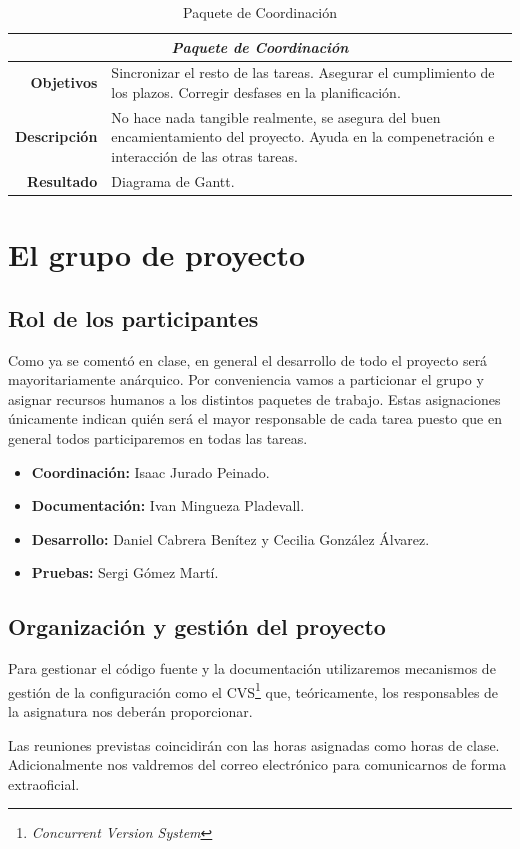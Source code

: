 \documentclass[a4paper,12pt,titlepage]{article}
\begin{document}
\begin{table}[h!]
\begin{tabular}{|r|p{}|}
\hline
\multicolumn{2}{|c|}{\emph{Paquete de Coordinación}} \\
\hline
\hline

\textbf{Objetivos} &
Sincronizar el resto de las tareas. Asegurar el cumplimiento de los plazos.
Corregir desfases en la planificación. \\
\hline
\textbf{Descripción} &
No hace nada tangible realmente, se asegura del buen encamientamiento del
proyecto. Ayuda en la compenetración e interacción de las otras tareas. \\
\hline
\textbf{Resultado} &
Diagrama de Gantt. \\
\hline
\end{tabular}
\caption{Paquete de Coordinación}\label{coord}
\end{table}


\section{El grupo de proyecto}

\subsection{Rol de los participantes}

Como ya se comentó en clase, en general el desarrollo de todo el proyecto será
mayoritariamente anárquico. Por conveniencia vamos a particionar el grupo y
asignar recursos humanos a los distintos paquetes de trabajo. Estas
asignaciones únicamente indican quién será el mayor responsable de cada tarea
puesto que en general todos participaremos en todas las tareas.

\begin{itemize}
\item \textbf{Coordinación:} Isaac Jurado Peinado.
\item \textbf{Documentación:} Ivan Mingueza Pladevall.
\item \textbf{Desarrollo:} Daniel Cabrera Benítez y Cecilia González Álvarez. 
\item \textbf{Pruebas:} Sergi Gómez Martí. 
\end{itemize}

\subsection{Organización y gestión del proyecto}

Para gestionar el código fuente y la documentación utilizaremos mecanismos de
gestión de la configuración como el CVS\footnote{\emph{Concurrent Version
System}} que, teóricamente, los responsables de la asignatura nos deberán
proporcionar.

Las reuniones previstas coincidirán con las horas asignadas como horas de
clase. Adicionalmente nos valdremos del correo electrónico para comunicarnos
de forma extraoficial.
\end{document}
